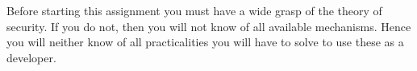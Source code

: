 Before starting this assignment you must have a wide grasp of the theory of 
security.
If you do not, then you will not know of all available mechanisms.
Hence you will neither know of all practicalities you will have to solve to use 
these as a developer.
